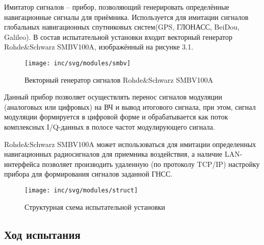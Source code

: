 Имитатор сигналов -- прибор, позволяющий генерировать определённые навигационные сигналы для приёмника. Используется для имитации сигналов глобальных навигационных спутниковых систем(GPS, ГЛОНАСС, BeiDou, Galileo). В состав испытательной установки входит векторный генератор Rohde\&Schwarz SMBV100A, изображённый на рисунке 3.1.
\begin{figure}[ht]
	\centering
	\texttt{[image: inc/svg/modules/smbv]}
	\caption{Векторный генератор сигналов Rohde\&Schwarz SMBV100A}
	\label{fig:smbv}
\end{figure}

Данный прибор позволяет осуществлять перенос сигналов модуляции (аналоговых или цифровых) на ВЧ и вывод итогового сигнала, при этом, сигнал модуляции формируется в цифровой форме и обрабатывается как поток комплексных I/Q-данных в полосе частот модулирующего сигнала.

Rohde\&Schwarz SMBV100A может использоваться для имитации определенных
навигационных радиосигналов для приемника воздействия, а наличие LAN-
интерфейса позволяет производить удаленную (по протоколу TCP/IP)
настройку прибора для формирования сигналов заданной ГНСС.
\begin{figure}[ht]
	\centering
	\texttt{[image: inc/svg/modules/struct]}
	\caption{Структурная схема испытательной установки}
	\label{fig:struct}
\end{figure}
\subsection{Ход испытания}

